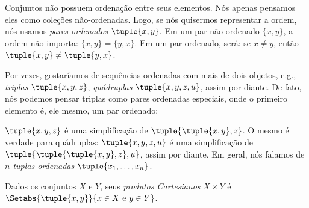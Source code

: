 \documentclass[../../../include/open-logic-section]{subfiles}
\begin{document}

\begin{explain}
Conjuntos não possuem ordenação entre seus elementos. Nós apenas  
pensamos eles como coleções não-ordenadas. Logo, se nós quisermos  
representar a ordem, nós usamos \emph{pares ordenados} $\tuple{x,y}$.
Em um par não-ordenado $\{x, y\}$, a ordem não importa: $\{x, y\} = \{y, x\}$. Em um par ordenado, será: se $x \neq y$, então $\tuple{x, y} \neq \tuple{y, x}$.

Por vezes, gostaríamos de sequências ordenadas com mais de dois objetos,
e.g., \emph{triplas} $\tuple{x, y, z}$, \emph{quádruplas} $\tuple{x, y, z, u}$, assim por diante. De fato, nós podemos pensar triplas como
pares ordenadas especiais, onde o primeiro elemento é, ele mesmo,
um par ordenado:

$\tuple{x, y, z}$ é uma simplificação de $\tuple{\tuple{x, y},z}$. O 
mesmo é verdade para quádruplas: $\tuple{x,y,z,u}$ é uma simplificação 
de $\tuple{\tuple{\tuple{x,y},z},u}$, assim por diante. Em geral, nós 
falamos de \emph{$n$-tuplas ordenadas} $\tuple{x_1, \dots, x_n}$.
\end{explain}



\begin{defn}
Dados os conjuntos $X$ e $Y$, seus \emph{produtos Cartesianos} $X \times Y$ é
$\Setabs{\tuple{x, y}}{x \in X \text{ e } y \in Y}$.
\end{defn}
\end{document}
